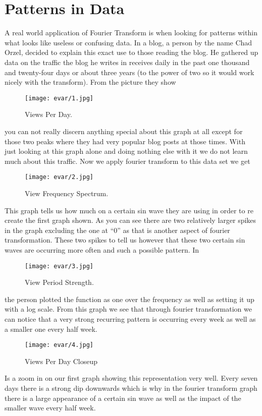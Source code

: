 \documentclass [../article.tex]{subfiles}
\begin{document}
  \section{Patterns in Data}
  A real world application of Fourier Transform is when
  looking for patterns within what looks like useless or
  confusing data. In a blog, a person by the name Chad
  Orzel, decided to explain this exact use to those
  reading the blog. He gathered up data on the traffic the
  blog he writes in receives daily in the past one thousand
  and twenty-four days or about three years (to the power of
  two so it would work nicely with the transform).
  From the picture they show
  \begin{figure}[h!]
    \texttt{[image: evar/1.jpg]}
    \caption{Views Per Day.}
    \label{fig:views}
  \end{figure}
  you can not really discern anything special about this graph
  at all except for those two peaks where they had very popular
  blog posts at those times. With just looking at this graph
  alone and doing nothing else with it we do not learn much
  about this traffic. Now we apply fourier transform to this
  data set we get
  \begin{figure}[htbp]
    \texttt{[image: evar/2.jpg]}
    \caption{View Frequency Spectrum.}
    \label{fig:viewfreq}
  \end{figure}
  This graph tells us how much on a certain sin wave they are
  using in order to re create the first graph shown. As you can
  see there are two relatively larger spikes in the graph
  excluding the one at “0” as that is another aspect of fourier
  transformation. These two spikes to tell us however that these
  two certain sin waves are occurring more often and such a
  possible pattern. In
  \begin{figure}[htbp]
    \texttt{[image: evar/3.jpg]}
    \caption{View Period Strength.}
    \label{fig:viewperiods}
  \end{figure}
  the person plotted the function as one over the frequency as
  well as setting it up with a log scale. From this graph we see
  that through  fourier transformation we can notice that a very
  strong recurring pattern is occurring every week as well as a
  smaller one every half week.
  \begin{figure}[htbp]
    \texttt{[image: evar/4.jpg]}
    \caption{Views Per Day Closeup}
    \label{fig:viewcloseup}
  \end{figure}
  Is a zoom in on our first graph showing this representation very
  well. Every seven days there is a strong dip downwards  which is
  why in the fourier transform graph there is a large appearance of
  a certain sin wave as well as the impact of the smaller wave every
  half week.
\end{document}
